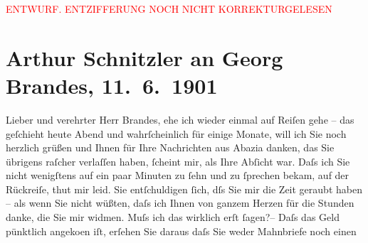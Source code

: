 
\begin{center}
            \textcolor{red}{ENTWURF. ENTZIFFERUNG NOCH NICHT KORREKTURGELESEN}
                      \end{center}
            
               \section[Arthur Schnitzler an Georg Brandes, 11. 6. 1901]{ Arthur Schnitzler an Georg Brandes, 11. 6. 1901}\nopagebreak{}\rehead{ }\begin{ledgroupsized}[t]{13cm}\normalsize\beginnumbering{} \toendnotes[C]{\smallbreak\pagebreak[2]} 
\toendnotes[C]{\smallbreak}\pstart{}{\pb}Lieber und verehrter Herr
                        Brandes,\pend\pstart
           ehe ich wieder einmal auf Reiſen gehe – das geſchieht heute Abend und
                    wahrſcheinlich für einige Monate, will ich Sie noch herzlich grüßen und Ihnen
                    für Ihre Nachrichten aus Abazia danken, das Sie
                    übrigens raſcher verlaſſen haben, ſcheint mir, als Ihre Abſicht war. Daſs ich
                    Sie {\pb}nicht wenigſtens auf ein paar
                    Minuten zu ſehn und zu ſprechen bekam, auf der Rückreiſe, thut mir leid. Sie
                    entſchuldigen ſich, dſs Sie mir die Zeit geraubt haben – als wenn Sie nicht
                    wüßten, daſs ich Ihnen von ganzem Herzen für die Stunden danke, die Sie mir
                    widmen. Muſs ich das wirklich erſt ſagen?– Daſs das Geld pünktlich angeko{\geminationm}en iſt, erſehen Sie daraus {\pb}daſs Sie weder Mahnbriefe noch einen

\end{ledgroupsized}
